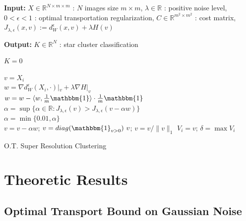 \documentclass{beamer}
\newcommand{\R}{{\mathbb{R}}}
\newcommand{\bbI}{{\mathbbm{1}}}
\begin{document}
\begin{frame}{}
\small

    \textbf{Input:} 
     $X \in \R^{N \times m \times m}$ : $N$ images size $m \times m$,
     $\lambda \in \R$ : positive noise level,
     $0 < \epsilon < 1$ : optimal transportation regularization,
     $C\in\R^{m^2 \times m^2}$ : cost matrix,
     $ J_{\lambda,\epsilon}(x,v) := d_W^\epsilon(x,v) + \lambda H(v) $
\pause

    \textbf{Output:}
     $K \in \R^N$ : star cluster classification
\pause

\hfill
\begin{minipage}{.74\textwidth}
\begin{algorithm}[H]
    
    
    $K = 0$
    
 	{
        $ v = X_i $ \\
 	    {
$w = \nabla d_W^\epsilon(X_i,\cdot)|_v + \lambda \nabla H|_v $ \\
$ w = w - \langle w, \frac{1}{m} \bbI \rangle \cdot \frac{1}{m} \bbI $ \\
\pause
$ \alpha = \sup\{\alpha \in \R : J_{\lambda,\epsilon}(v) > J_{\lambda,\epsilon}(v - \alpha w) \}$ \\
            $ \alpha = \min\{0.01, \alpha\}$\\
\pause
 	        $ v = v - \alpha w $;
 	        $ v = diag(\bbI_{v > 0}) \ v $;
 	        $ v = v/\|v\|_1 $
 	    }
\pause
 	    $V_i = v$;
     	$\delta = \max V_i$
     	
  	}
	\caption{\tiny O.T. Super Resolution Clustering \cite{rawson_astro}}
	\label{algo:star_cluster}
\end{algorithm}
\end{minipage}

\end{frame}


\section{Theoretic Results}

\subsection{Optimal Transport Bound on Gaussian Noise}
\end{document}
